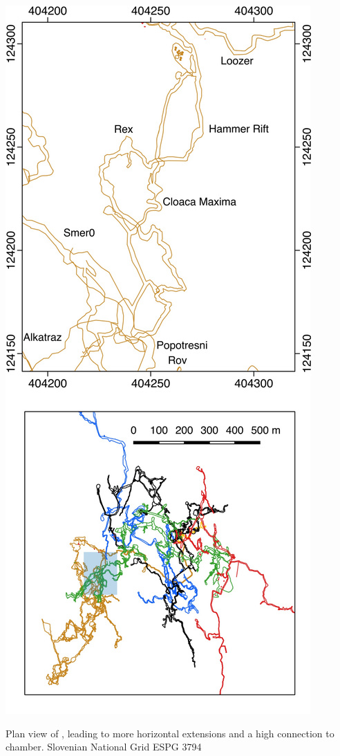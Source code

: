 \begin{marginfigure}
\checkoddpage \ifoddpage \forcerectofloat \else \forceversofloat \fi
\centering
 \includegraphics[width=\linewidth]{images/little_insets/cm_inset.pdf}
 \caption{Plan view of \protect{}, leading to more horizontal extensions and a high connection to \protect{} chamber. Slovenian National Grid ESPG 3794}
 \label{Mountain King inset}
\end{marginfigure}

